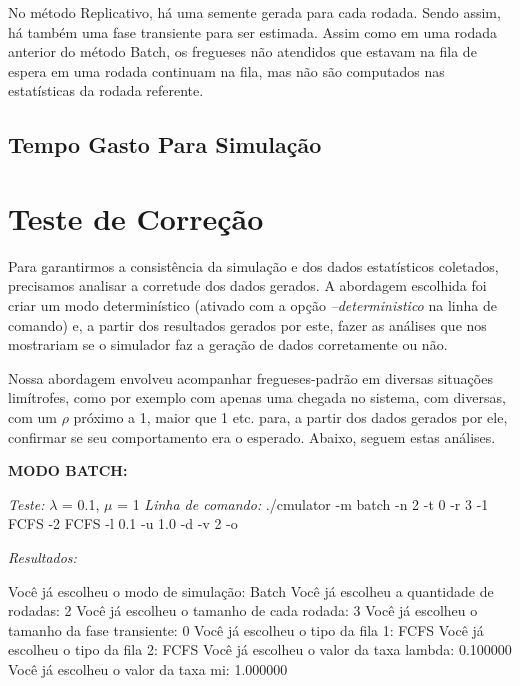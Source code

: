 \documentclass[a4paper,10pt]{article}
\begin{document}
    No método Replicativo, há uma semente gerada para cada rodada. Sendo assim, há também uma fase transiente para ser estimada. Assim como em uma rodada anterior do método Batch, os fregueses não atendidos que estavam na fila de espera em uma rodada continuam na fila, mas não são computados nas estatísticas da rodada referente.


\subsection{Tempo Gasto Para Simulação}

\pagebreak

\section{Teste de Correção}

    Para garantirmos a consistência da simulação e dos dados estatísticos coletados, precisamos analisar a corretude dos dados gerados. A abordagem escolhida foi criar um modo determinístico (ativado com a opção \emph{--deterministico} na linha de comando) e, a partir dos resultados gerados por este, fazer as análises que nos mostrariam se o simulador faz a geração de dados corretamente ou não.

    Nossa abordagem envolveu acompanhar fregueses-padrão em diversas situações limítrofes, como por exemplo com apenas uma chegada no sistema, com diversas, com um $\rho$ próximo a 1, maior que 1 etc. para, a partir dos dados gerados por ele, confirmar se seu comportamento era o esperado. Abaixo, seguem estas análises.

\textbf{MODO BATCH:}

\emph{Teste:} $\lambda$ = 0.1, $\mu$ = 1
\emph{Linha de comando:}
     ./cmulator -m batch -n 2 -t 0 -r 3 -1 FCFS -2 FCFS -l 0.1 -u 1.0 -d -v 2 -o

\emph{Resultados:}

Você já escolheu o modo de simulação: Batch
Você já escolheu a quantidade de rodadas: 2
Você já escolheu o tamanho de cada rodada: 3
Você já escolheu o tamanho da fase transiente: 0
Você já escolheu o tipo da fila 1: FCFS
Você já escolheu o tipo da fila 2: FCFS
Você já escolheu o valor da taxa lambda: 0.100000
Você já escolheu o valor da taxa mi: 1.000000
\end{document}
